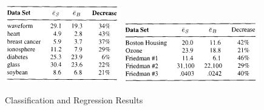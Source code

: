 \documentclass[12pt]{article}
\begin{document}
 \begin{figure}[h!]
 	\centering
	\includegraphics{baggingClassification.png}
	\includegraphics{baggingRegression.png}
	\caption{\citep{breiman1996bagging} Classification and Regression Results}
	\label{fig:baggingResults}
\end{figure}
\end{document}
